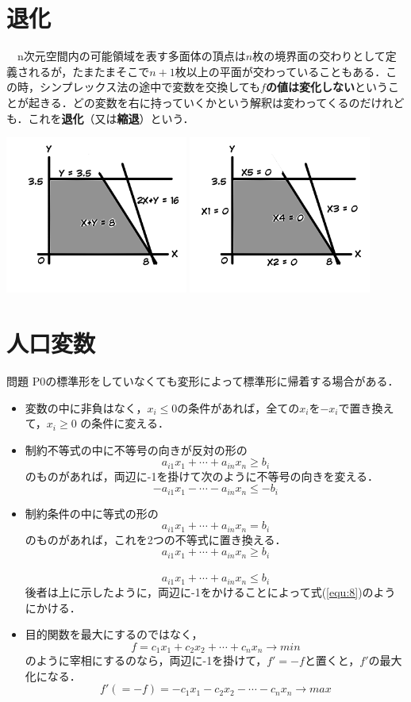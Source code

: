 \documentclass[dvipdfmx,autodetect-engine]{jsarticle}
\newcommand{\Equref}[1]{式(\ref{equ:#1})}
\newcommand{\eq}[1]{ \begin{equation}#1 \end{equation}}
\begin{document}
\section{退化}
　n次元空間内の可能領域を表す多面体の頂点は$n$枚の境界面の交わりとして定義されるが，たまたまそこで$n+1$枚以上の平面が交わっていることもある．この時，シンプレックス法の途中で変数を交換しても\textbf{$f$の値は変化しない}ということが起きる．どの変数を右に持っていくかという解釈は変わってくるのだけれども．これを\textbf{退化}（又は\textbf{縮退}）という．

 \includegraphics[width=6cm]{degeneration_0}  \includegraphics[width=6cm]{degeneration_1}
 
 
\section{人口変数}
問題 P0の標準形をしていなくても変形によって標準形に帰着する場合がある．
\begin{itemize}
\item 変数の中に非負はなく，$x_{i}\leq 0$の条件があれば，全ての$x_{i}$を$-x_{i}$で置き換えて，$x_{i}\geq 0$ の条件に変える．
\item 制約不等式の中に不等号の向きが反対の形の\eq{a_{i1}x_{1}+\cdots+a_{in}x_{n}\geq b_{i}}のものがあれば，両辺に-1を掛けて次のように不等号の向きを変える．\eq{\label{equ:8}-a_{i1}x_{1}-\cdots-a_{in}x_{n}\leq -b_{i}}
\item 制約条件の中に等式の形の\eq{a_{i1}x_{1}+\cdots+a_{in}x_{n}= b_{i}}のものがあれば，これを2つの不等式に置き換える．\eq{a_{i1}x_{1}+\cdots+a_{in}x_{n}\geq b_{i}}　\eq{a_{i1}x_{1}+\cdots+a_{in}x_{n}\leq b_{i}}後者は上に示したように，両辺に-1をかけることによって\Equref{8}のようにかける．
\item 目的関数を最大にするのではなく，\eq{
	f  = c_{1}x_{1} + c_{2}x_{2} + \cdots +  c_{n}x_{n}  \to min
}のように宰相にするのなら，両辺に-1を掛けて，$f'=-f$と置くと，$f'$の最大化になる．\eq{
	f'(=-f) = -c_{1}x_{1} - c_{2}x_{2} - \cdots -  c_{n}x_{n}  \to max
}
\end{itemize}
\end{document}
